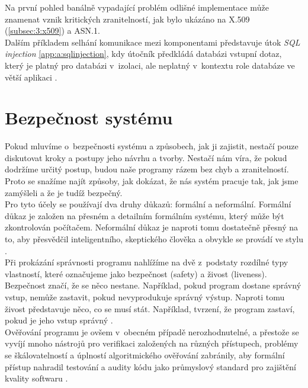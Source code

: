 Na první pohled banálně vypadající problém odlišné implementace může znamenat vznik kritických zranitelností, jak bylo ukázáno na 
X.509 (\ref{subsec:3:x509}) a ASN.1. \\

Dalším příkladem selhání komunikace mezi komponentami představuje útok \textit{SQL injection} \ref{app:a:sqlinjection}, kdy útočník předkládá databázi 
vstupní dotaz, který je platný pro databázi v~izolaci, ale neplatný v~kontextu role databáze ve větší aplikaci \cite[str. 491]{Sass2013}.

\section{Bezpečnost systému} \label{sec:4:systemsecurity} 
Pokud mluvíme o~bezpečnosti systému a způsobech, jak ji zajistit, nestačí pouze diskutovat kroky a postupy jeho návrhu a tvorby. Nestačí nám víra, že 
pokud dodržíme určitý postup, budou naše programy rázem bez chyb a zranitelností. Proto se snažíme najít způsoby, jak dokázat, že nás systém pracuje tak, 
jak jsme zamýšleli a že je tudíž bezpečný. \\

Pro tyto účely se používají dva druhy důkazů: formální a neformální. Formální důkaz je založen na přesném a detailním formálním systému, který může být 
zkontrolován počítačem. Neformální důkaz je naproti tomu dostatečně přesný na to, aby přesvědčil inteligentního, skeptického člověka a obvykle se 
provádí ve stylu  \cite[str. 125]{Lamport1977}. \\

Při prokázání správnosti programu nahlížíme na dvě z~podstaty rozdílné typy vlastností, které označujeme jako bezpečnost (safety) a živost (liveness). 
Bezpečnost značí, že se něco nestane. Například, pokud program dostane správný vstup, nemůže zastavit, pokud nevyprodukuje správný výstup. Naproti tomu 
živost představuje něco, co se musí stát. Například, tvrzení, že program zastaví, pokud je jeho vstup správný \cite[str. 125]{Lamport1977}. \\

Ověřování programu je ovšem v~obecném případě nerozhodnutelné, a přestože se vyvíjí mnoho nástrojů pro verifikaci založených na různých přístupech, 
problémy se škálovatelností a úplností algoritmického ověřování zabránily, aby formální přístup nahradil testování a audity kódu jako průmyslový 
standard pro zajištění kvality softwaru \cite[str. 490]{Sass2013}. \\

